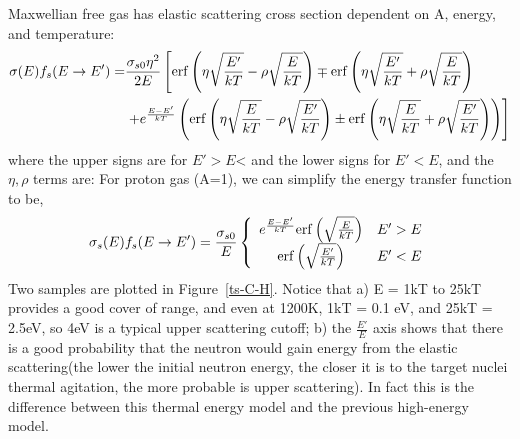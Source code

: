 \documentclass{school-22.211-notes}
\begin{document}
\clearpage
{}
Maxwellian free gas has elastic scattering cross section dependent on A, energy, and temperature:
\begin{align}
  \sigma(E) f_s (E \to E') = &\frac{\sigma_{s0} \eta^2}{2E} \left[ \mathrm{erf}\left( \eta \sqrt{\frac{E'}{kT}} - \rho \sqrt{\frac{E}{kT}}  \right) \mp \mathrm{erf}\left( \eta \sqrt{\frac{E'}{kT}} + \rho \sqrt{\frac{E}{kT}}  \right) \right. \\
    & \left. + e^{\frac{E - E'}{kT}} \left( \mathrm{erf}\left(  \eta \sqrt{\frac{E}{kT}} - \rho \sqrt{\frac{E'}{kT}}  \right)  \pm \mathrm{erf}\left( \eta \sqrt{\frac{E}{kT}} + \rho \sqrt{\frac{E'}{kT}}  \right) \right) \right] 
\end{align}
where the upper signs are for $E' > E$< and the lower signs for $E' < E$, and the $\eta, \rho$ terms are:
For proton gas (A=1), we can simplify the energy transfer function to be,
\begin{align}
\sigma_s(E) f_s(E\to E') = \frac{\sigma_{s0}}{E} \left\{ 
\begin{array}{cc}
e^{\frac{E-E'}{kT}} \mathrm{erf}\left( \sqrt{\frac{E}{kT}} \right) & E' > E \\
\mathrm{erf}\left( \sqrt{\frac{E'}{kT}} \right) & E' < E 
\end{array}
\right.
\end{align}
Two samples are plotted in Figure~\ref{ts-C-H}. Notice that a) E = 1kT to 25kT provides a good cover of range, and even at 1200K, 1kT = 0.1 eV, and 25kT = 2.5eV, so 4eV is a typical upper scattering cutoff; b) the $\frac{E'}{E}$ axis shows that there is a good probability that the neutron would gain energy from the elastic scattering(the lower the initial neutron energy, the closer it is to the target nuclei thermal agitation, the more probable is upper scattering). In fact this is the difference between this thermal energy model and the previous high-energy model.  
\end{document}
